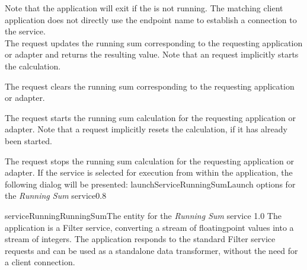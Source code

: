 Note that the application will exit if the  is not
running.
\insertAutoAppParameters
{}
The matching client application does not directly use the endpoint name to establish a
connection to the service.\\

The  request updates the running sum
corresponding to the requesting application or adapter and returns the resulting value.
Note that an  request implicitly starts the
calculation.\\
%

The  request clears the running sum
corresponding to the requesting application or adapter.\\
%

The  request starts the running sum
calculation for the requesting application or adapter.
Note that a  request implicitly resets the
calculation, if it has already been started.\\
%

The  request stops the running sum
calculation for the requesting application or adapter.
%
\condPage{}
If the service is selected for execution from within the \emph{\MMMU} application, the
following dialog will be presented:
%
{launchServiceRunningSum}{Launch options for the \emph{Running Sum} service}{0.8}

%
{serviceRunningRunningSum}{The \emph{\MMMU} entity for the \emph{Running Sum} service}%
{1.0}
The  application is a Filter
service, converting a stream of floating\longDash{}point values into a stream of integers.
The application responds to the standard Filter service requests and can be used as a
standalone data transformer, without the need for a client connection.\\

